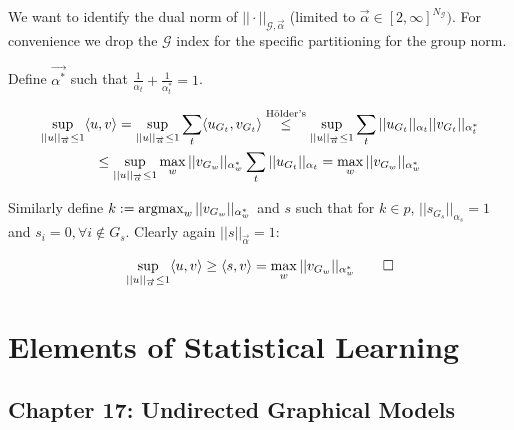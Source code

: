 \documentclass[11pt]{article}
\begin{document}
We want to identify the dual norm of $||\cdot||_{\mathcal{G}, \overrightarrow\alpha}$ (limited to $\overrightarrow{\alpha} \in [2,\infty]^{N_\mathcal{G}})$. For convenience we drop the $\mathcal{G}$ index for the specific partitioning for the group norm. \newline 

Define $\overrightarrow{\alpha^*}$ such that $\frac{1}{\alpha_t} + \frac{1}{\alpha^*_t} = 1$. 

\begin{gather*}
    \sup_{||u||_{\overrightarrow\alpha} \leq 1} 
    \langle u,v\rangle
    =
    \sup_{||u||_{\overrightarrow\alpha} \leq 1} 
    \sum_t 
    \langle u_{G_t}, v_{G_t}\rangle
    \stackrel{\text{H\"{o}lder's}}{\leq}
    \sup_{||u||_{\overrightarrow\alpha} \leq 1} 
    \sum_t 
    ||u_{G_t}||_{\alpha_t}
    ||v_{G_t}||_{\alpha^*_t}
\\
    \leq 
    \sup_{||u||_{\overrightarrow\alpha} \leq 1} 
    \max_w ||v_{G_w}||_{\alpha^*_w}
    \sum_t 
    ||u_{G_t}||_{\alpha_t}
    =
    \max_w ||v_{G_w}||_{\alpha^*_w}
\end{gather*}

Similarly define $k := \operatorname{argmax}_w ||v_{G_w}||_{\alpha^*_w}
$ and $s$ such that for $k \in p$, $||s_{G_s}||_{\alpha_s}=1$ and $s_i=0, \forall i \not\in G_s$. Clearly again $||s||_{\overrightarrow{\alpha}} = 1$:

\begin{gather}
        \sup_{||u||_{\overrightarrow\alpha} \leq 1} 
        \langle u, v\rangle
        \geq 
        \langle s, v\rangle
        =
        \max_w ||v_{G_w}||_{\alpha^*_w} 
        \qed 
\end{gather}







\newpage
\begin{tcolorbox}
\vspace{4mm}
\bf \LARGE \chapter{Elements of Statistical Learning}
\vspace{4mm}
\end{tcolorbox}

\section*{Chapter 17: Undirected Graphical Models}
\end{document}
